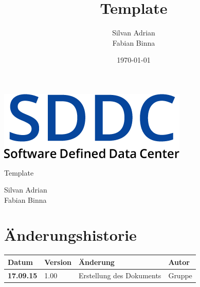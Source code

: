 \documentclass[11pt]{scrartcl}
\title{Template}
\author{Silvan Adrian \\ Fabian Binna}
\date{\today{}}
\begin{document}
\def\arraystretch{1.5}
\begin{titlepage}
\begin{center}
\vspace{10em}
\includegraphics[scale=2]{SDDC}
\vspace{10em}
\end{center}
\begin{center}
\huge {Template}
\end{center}
\begin{center}
\vspace{10em}
\LARGE {Silvan Adrian} \\
\LARGE {Fabian Binna}
\end{center}

\end{titlepage}

\newpage
\section{Änderungshistorie}
\begin{tabularx}{\linewidth}{l l X l}
\textbf{Datum} & \textbf{Version} & \textbf{Änderung}  & \textbf{Autor} \\
\hline
\textbf{17.09.15} & 1.00 & Erstellung des Dokuments & Gruppe \\

\end{tabularx}

\newpage
\tableofcontents
\newpage
\end{document}
